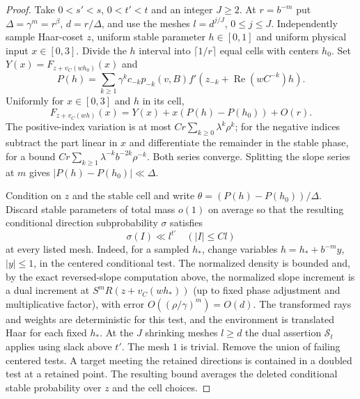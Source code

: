 \documentclass[11pt,a4paper]{article}
\begin{document}
\begin{proof}
Take $0<s'<s$, $0<t'<t$ and an integer $J\ge2$.
At $r=b^{-m}$ put $\Delta=\gamma^m=r^\beta$, $d=r/\Delta$,
and use the meshes $l=d^{j/J}$, $0\le j\le J$.
Independently sample Haar-coset $z$, uniform stable parameter
$h\in[0,1]$ and uniform physical input $x\in[0,3]$. Divide the
$h$ interval into $\lceil1/r\rceil$ equal cells with centers $h_0$.
Set $Y(x)=F_{z+v_C(wh_0)}(x)$ and
\[
 P(h)=\sum_{k\ge1}\gamma^k c_{-k} p_{-k}(v,B)
             f'(z_{-k}+\operatorname{Re}(w C^{-k})h).
\]
Uniformly for $x\in[0,3]$ and $h$ in its cell,
\[
 F_{z+v_C(wh)}(x)=Y(x)+x(P(h)-P(h_0))+O(r).                    \tag{B2}
\]
The positive-index variation is at most
$Cr\sum_{k\ge0}\lambda^k\rho^k$; for the negative indices subtract
the part linear in $x$ and differentiate the remainder in the stable
phase, for a bound $Cr\sum_{k\ge1}\lambda^{-k}b^{-2k}\rho^{-k}$.
Both series converge. Splitting the slope series at $m$ gives
$|P(h)-P(h_0)|\ll\Delta$.

Condition on $z$ and the stable cell and write
$\theta=(P(h)-P(h_0))/\Delta$. Discard stable parameters of total
mass $o(1)$ on average so that the resulting conditional direction
subprobability $\sigma$ satisfies
\[
 \sigma(I)\ll l^{t'} \quad (|I|\le C l)                         \tag{B3}
\]
at every listed mesh. Indeed, for a sampled $h_*$, change variables
$h=h_*+b^{-m}y$, $|y|\le1$, in the centered conditional test. The
normalized density is bounded and, by the exact reversed-slope
computation above, the normalized slope increment is a dual increment
at $S^m R(z+v_C(wh_*))$ (up to fixed phase adjustment and multiplicative
factor), with error $O((\rho/\gamma)^m)=O(d)$. The transformed rays
and weights are deterministic for this test, and the environment is
translated Haar for each fixed $h_*$. At the $J$ shrinking meshes
$l\ge d$ the dual assertion $\mathcal S_t$ applies using slack above
$t'$. The mesh $1$ is trivial. Remove the union of failing centered
tests. A target meeting the retained directions is contained in a
doubled test at a retained point. The resulting bound averages the
deleted conditional stable probability over $z$ and the cell choices.


\end{proof}
\end{document}
